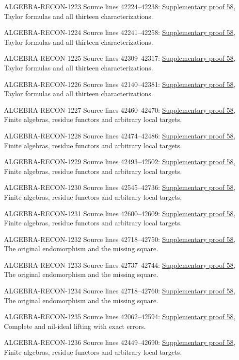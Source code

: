 \begin{AlgebraSourceRoutes}
\item[ALGEBRA-RECON-1223] Source lines 42224--42238: \hyperlink{algebra_henselian_notes_20260929}{Supplementary proof 58}, Taylor formulas and all thirteen characterizations.
\item[ALGEBRA-RECON-1224] Source lines 42241--42258: \hyperlink{algebra_henselian_notes_20260929}{Supplementary proof 58}, Taylor formulas and all thirteen characterizations.
\item[ALGEBRA-RECON-1225] Source lines 42309--42317: \hyperlink{algebra_henselian_notes_20260929}{Supplementary proof 58}, Taylor formulas and all thirteen characterizations.
\item[ALGEBRA-RECON-1226] Source lines 42140--42381: \hyperlink{algebra_henselian_notes_20260929}{Supplementary proof 58}, Taylor formulas and all thirteen characterizations.
\item[ALGEBRA-RECON-1227] Source lines 42460--42470: \hyperlink{algebra_henselian_notes_20260929}{Supplementary proof 58}, Finite algebras, residue functors and arbitrary local targets.
\item[ALGEBRA-RECON-1228] Source lines 42474--42486: \hyperlink{algebra_henselian_notes_20260929}{Supplementary proof 58}, Finite algebras, residue functors and arbitrary local targets.
\item[ALGEBRA-RECON-1229] Source lines 42493--42502: \hyperlink{algebra_henselian_notes_20260929}{Supplementary proof 58}, Finite algebras, residue functors and arbitrary local targets.
\item[ALGEBRA-RECON-1230] Source lines 42545--42736: \hyperlink{algebra_henselian_notes_20260929}{Supplementary proof 58}, Finite algebras, residue functors and arbitrary local targets.
\item[ALGEBRA-RECON-1231] Source lines 42600--42609: \hyperlink{algebra_henselian_notes_20260929}{Supplementary proof 58}, Finite algebras, residue functors and arbitrary local targets.
\item[ALGEBRA-RECON-1232] Source lines 42718--42750: \hyperlink{algebra_henselian_notes_20260929}{Supplementary proof 58}, The original endomorphism and the missing square.
\item[ALGEBRA-RECON-1233] Source lines 42737--42744: \hyperlink{algebra_henselian_notes_20260929}{Supplementary proof 58}, The original endomorphism and the missing square.
\item[ALGEBRA-RECON-1234] Source lines 42718--42760: \hyperlink{algebra_henselian_notes_20260929}{Supplementary proof 58}, The original endomorphism and the missing square.
\item[ALGEBRA-RECON-1235] Source lines 42062--42594: \hyperlink{algebra_henselian_notes_20260929}{Supplementary proof 58}, Complete and nil-ideal lifting with exact errors.
\item[ALGEBRA-RECON-1236] Source lines 42449--42690: \hyperlink{algebra_henselian_notes_20260929}{Supplementary proof 58}, Finite algebras, residue functors and arbitrary local targets.
\end{AlgebraSourceRoutes}

